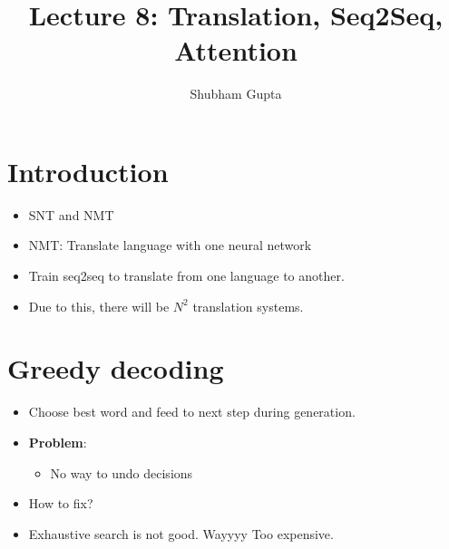 \documentclass[a4paper]{article}
\title{Lecture 8: Translation, Seq2Seq, Attention}
\author{Shubham Gupta}
\begin{document}
\maketitle
\section{Introduction}
\begin{itemize}
    \item SNT and NMT
    \item NMT: Translate language with one neural network
    \item Train seq2seq to translate from one language to another.
    \item Due to this, there will be $N^2$ translation systems.
\end{itemize}

\section{Greedy decoding}
\begin{itemize}
    \item Choose best word and feed to next step during generation.
    \item \textbf{Problem}:  
    \begin{itemize}
        \item No way to undo decisions
    \end{itemize}
    \item How to fix?
    \item Exhaustive search is not good. Wayyyy Too expensive.
\end{itemize}
\end{document}
